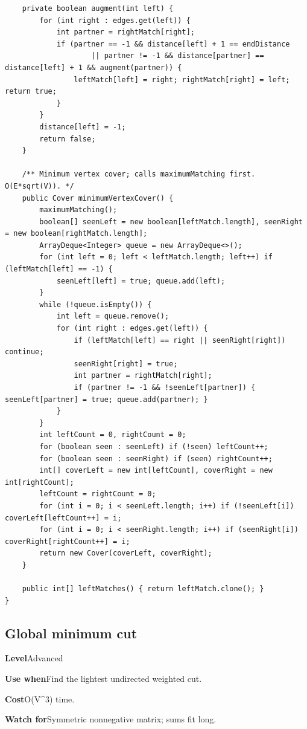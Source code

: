 \documentclass[10pt,letterpaper]{article}
\newcommand{\entrylabel}[1]{\textcolor{accent}{\bfseries #1}}
\begin{document}
\begin{lstlisting}
    private boolean augment(int left) {
        for (int right : edges.get(left)) {
            int partner = rightMatch[right];
            if (partner == -1 && distance[left] + 1 == endDistance
                    || partner != -1 && distance[partner] == distance[left] + 1 && augment(partner)) {
                leftMatch[left] = right; rightMatch[right] = left; return true;
            }
        }
        distance[left] = -1;
        return false;
    }

    /** Minimum vertex cover; calls maximumMatching first. O(E*sqrt(V)). */
    public Cover minimumVertexCover() {
        maximumMatching();
        boolean[] seenLeft = new boolean[leftMatch.length], seenRight = new boolean[rightMatch.length];
        ArrayDeque<Integer> queue = new ArrayDeque<>();
        for (int left = 0; left < leftMatch.length; left++) if (leftMatch[left] == -1) {
            seenLeft[left] = true; queue.add(left);
        }
        while (!queue.isEmpty()) {
            int left = queue.remove();
            for (int right : edges.get(left)) {
                if (leftMatch[left] == right || seenRight[right]) continue;
                seenRight[right] = true;
                int partner = rightMatch[right];
                if (partner != -1 && !seenLeft[partner]) { seenLeft[partner] = true; queue.add(partner); }
            }
        }
        int leftCount = 0, rightCount = 0;
        for (boolean seen : seenLeft) if (!seen) leftCount++;
        for (boolean seen : seenRight) if (seen) rightCount++;
        int[] coverLeft = new int[leftCount], coverRight = new int[rightCount];
        leftCount = rightCount = 0;
        for (int i = 0; i < seenLeft.length; i++) if (!seenLeft[i]) coverLeft[leftCount++] = i;
        for (int i = 0; i < seenRight.length; i++) if (seenRight[i]) coverRight[rightCount++] = i;
        return new Cover(coverLeft, coverRight);
    }

    public int[] leftMatches() { return leftMatch.clone(); }
}
\end{lstlisting}
\subsection{Global minimum cut}
\begin{guidebox}\small
\entrylabel{Level}\quad Advanced\par
\entrylabel{Use when}\quad Find the lightest undirected weighted cut.\par
\entrylabel{Cost}\quad O(V\textasciicircum{}3) time.\par
\entrylabel{Watch for}\quad Symmetric nonnegative matrix; sums fit long.\par
\end{guidebox}
\end{document}
